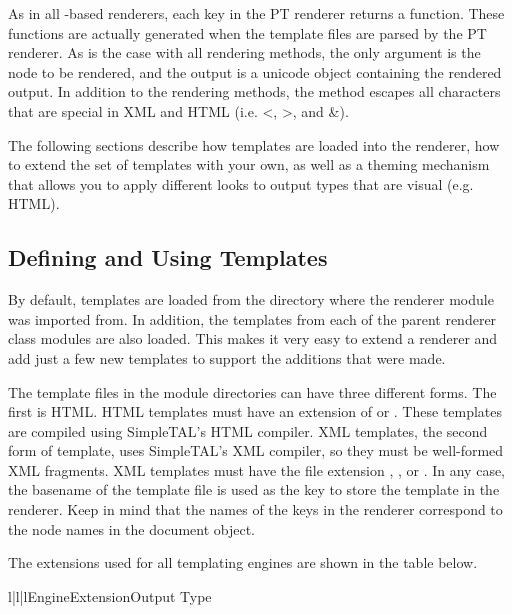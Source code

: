 As in all -based renderers, each key in the PT renderer
returns a function.  These functions are actually generated when the
template files are parsed by the PT renderer.
As is the case with all rendering methods, the only argument is the node to be
rendered, and the output is a unicode object containing the rendered
output. In addition to the rendering methods, the  method
escapes all characters that are special in XML and HTML (i.e. <, >, and \&).

The following sections describe how templates are loaded into the
renderer, how to extend the set of templates with your own, as well
as a theming mechanism that allows you to apply different looks to
output types that are visual (e.g. HTML).

\subsection{Defining and Using Templates}


By default, templates are loaded from the directory where the
renderer module was imported from.  In addition, the templates from
each of the parent renderer class modules are also loaded.  This makes
it very easy to extend a renderer and add just a few new templates
to support the additions that were made.

The template files in the module directories can have three different forms.
The first is HTML.  HTML templates must have an extension of  or
 .  These templates are compiled using
SimpleTAL's HTML compiler.  XML templates, the second form of template,
uses SimpleTAL's XML compiler, so they must be well-formed XML
fragments.  XML templates must have the file extension ,
, or .  In any case, the basename of the template
file is used as the key to store the template in the renderer.  Keep in
mind that the names of the keys in the renderer correspond to the node
names in the document object.

The extensions used for all templating engines are shown in the table below.
\begin{tableiii}{l|l|l}{}{Engine}{Extension}{Output Type}
\end{tableiii}


